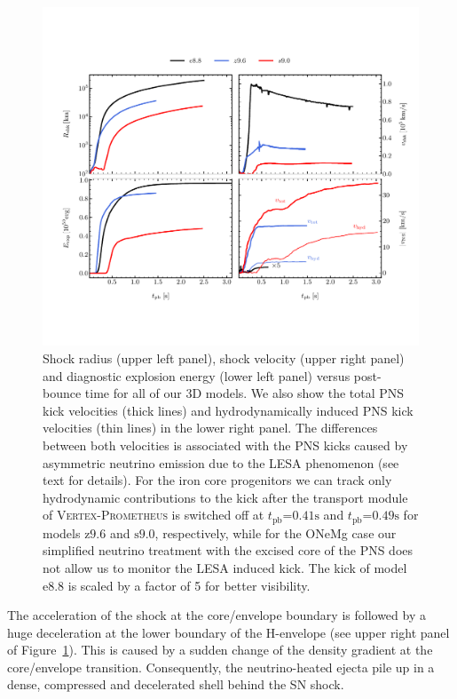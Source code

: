 \documentclass[fleqn,usenatbib]{mnras}
\newcommand{\tpb}{\ensuremath{t_{\text{pb}}}}
\newcommand{\s}{\ensuremath{\text{s}}}
\newcommand{\vertexprom}{\textsc{Vertex-Prometheus}\xspace}
\newcommand{\onemg}{\ensuremath{\mathrm{e8.8}}\xspace}
\newcommand{\snine}{\ensuremath{\mathrm{s9.0}}\xspace}
\newcommand{\znine}{\ensuremath{\mathrm{z9.6}}\xspace}
\begin{document}
\begin{figure}
 \centering
 \includegraphics[width=\textwidth,trim=0.1cm 2.1cm 0cm 2.3cm,clip]{./pic/eexp_shk_kick_all_paper.pdf}
 \caption{Shock radius (upper left panel), shock velocity (upper right panel) and diagnostic 
 explosion energy (lower left panel) versus post-bounce time for all of our 3D models. 
 We also show the total PNS kick velocities (thick lines) and hydrodynamically induced PNS 
 kick velocities (thin lines) in the lower right panel. The differences between both
 velocities is associated 
 with the PNS kicks caused by asymmetric neutrino emission due to the LESA phenomenon 
 (see text for details). For the iron core progenitors we can track only hydrodynamic 
 contributions to the kick after the transport module of \vertexprom is switched off at 
 $\tpb\mathord{=}0.41\s$ and $\tpb\mathord{=}0.49\s$ for models \znine and \snine, respectively,  
 while for the ONeMg case our simplified neutrino treatment with the excised core of the PNS 
 does not allow us to monitor the LESA induced kick. The kick of model \onemg is scaled by a
 factor of 5 for better visibility. }
\label{fig:eexp all}
\end{figure}

The acceleration of the shock at the core/envelope boundary is followed by
a huge deceleration at the lower boundary of the H-envelope 
(see upper right panel of Figure~\ref{fig:eexp all}). This is caused 
by a sudden change of the density gradient at the core/envelope transition.  
Consequently, the neutrino-heated ejecta pile up in a dense, compressed and
decelerated shell behind the SN shock.
\end{document}
